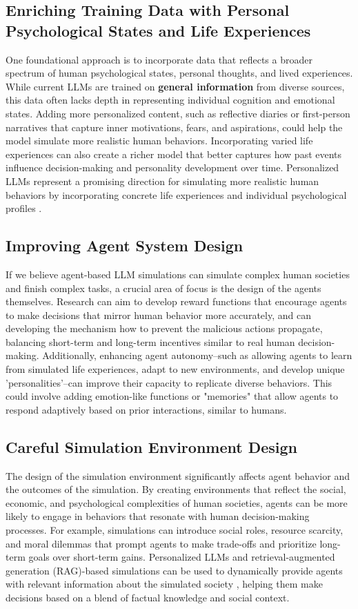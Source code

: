 \subsection{Enriching Training Data with Personal Psychological States and Life Experiences}
One foundational approach is to incorporate data that reflects a broader spectrum of human psychological states, personal thoughts, and lived experiences. While current LLMs are trained on \textbf{general information} from diverse sources, this data often lacks depth in representing individual cognition and emotional states. Adding more personalized content, such as reflective diaries or first-person narratives that capture inner motivations, fears, and aspirations, could help the model simulate more realistic human behaviors. Incorporating varied life experiences can also create a richer model that better captures how past events influence decision-making and personality development over time. Personalized LLMs represent a promising direction for simulating more realistic human behaviors by incorporating concrete life experiences and individual psychological profiles \citep{tseng2024two}.

\subsection{Improving Agent System Design}
If we believe agent-based LLM simulations can simulate complex human societies and finish complex tasks, a crucial area of focus is the design of the agents themselves. Research can aim to develop reward functions that encourage agents to make decisions that mirror human behavior more accurately, and can developing the mechanism how to prevent the malicious actions propagate, balancing short-term and long-term incentives similar to real human decision-making. Additionally, enhancing agent autonomy--such as allowing agents to learn from simulated life experiences, adapt to new environments, and develop unique 'personalities'--can improve their capacity to replicate diverse behaviors. This could involve adding emotion-like functions or "memories" that allow agents to respond adaptively based on prior interactions, similar to humans.

\subsection{Careful Simulation Environment Design}
The design of the simulation environment significantly affects agent behavior and the outcomes of the simulation. By creating environments that reflect the social, economic, and psychological complexities of human societies, agents can be more likely to engage in behaviors that resonate with human decision-making processes. For example, simulations can introduce social roles, resource scarcity, and moral dilemmas that prompt agents to make trade-offs and prioritize long-term goals over short-term gains. Personalized LLMs and retrieval-augmented generation (RAG)-based simulations can be used to dynamically provide agents with relevant information about the simulated society \citep{xu2024genai}, helping them make decisions based on a blend of factual knowledge and social context.


